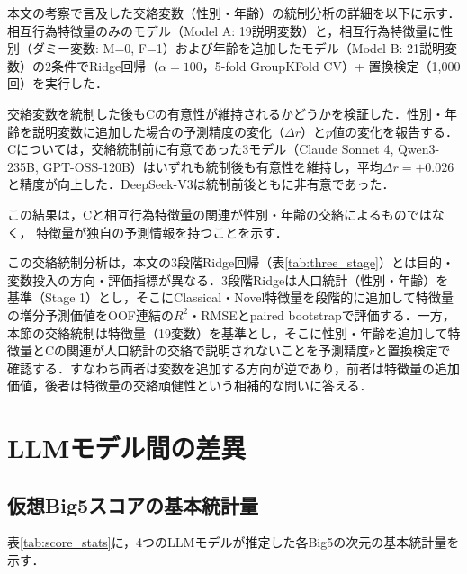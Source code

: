 \documentclass[dvipdfmx,11pt,a4paper]{bxjsarticle}
\renewcommand{\_}{\paperorigunderscore\allowbreak}%
\begin{document}
本文の考察で言及した交絡変数（性別・年齢）の統制分析の詳細を以下に示す．相互行為特徴量のみのモデル（Model A: 19説明変数）と，相互行為特徴量に性別（ダミー変数: M=0, F=1）および年齢を追加したモデル（Model B: 21説明変数）の2条件でRidge回帰（$\alpha = 100$，5-fold GroupKFold CV）+ 置換検定（1,000回）を実行した．

交絡変数を統制した後もCの有意性が維持されるかどうかを検証した．性別・年齢を説明変数に追加した場合の予測精度の変化（$\Delta r$）と$p$値の変化を報告する．Cについては，交絡統制前に有意であった3モデル（Claude Sonnet 4, Qwen3-235B, GPT-OSS-120B）はいずれも統制後も有意性を維持し，平均$\Delta r = +0.026$と精度が向上した．DeepSeek-V3は統制前後ともに非有意であった．

この結果は，Cと相互行為特徴量の関連が性別・年齢の交絡によるものではなく，
特徴量が独自の予測情報を持つことを示す．

この交絡統制分析は，本文の3段階Ridge回帰（表\ref{tab:three_stage}）とは目的・変数投入の方向・評価指標が異なる．3段階Ridgeは人口統計（性別・年齢）を基準（Stage 1）とし，そこにClassical・Novel特徴量を段階的に追加して特徴量の増分予測価値をOOF連結の$R^2$・RMSEとpaired bootstrapで評価する．一方，本節の交絡統制は特徴量（19変数）を基準とし，そこに性別・年齢を追加して特徴量とCの関連が人口統計の交絡で説明されないことを予測精度$r$と置換検定で確認する．すなわち両者は変数を追加する方向が逆であり，前者は特徴量の追加価値，後者は特徴量の交絡頑健性という相補的な問いに答える．


\section{LLMモデル間の差異}
\label{sec:appendix_llm}

\subsection{仮想Big5スコアの基本統計量}
\label{sec:appendix_score_stats}

表\ref{tab:score_stats}に，4つのLLMモデルが推定した各Big5の次元の基本統計量を示す．

\end{document}
